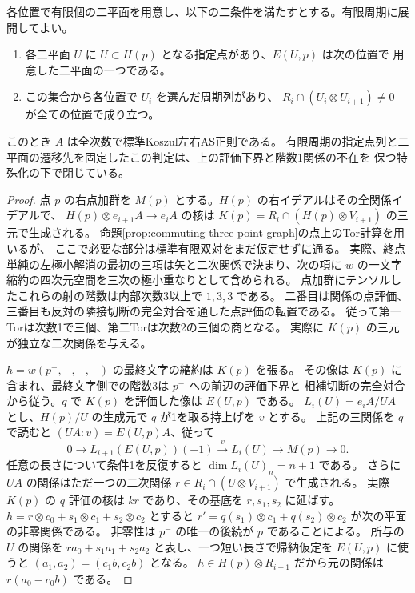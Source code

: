 \begin{theorem}\label{thm:recurrent-point-line-flags}
各位置で有限個の二平面を用意し、以下の二条件を満たすとする。有限周期に展開してよい。
\begin{enumerate}
\item 各二平面 $U$ に $U\subset H(p)$ となる指定点があり、$E(U,p)$ は次の位置で
用意した二平面の一つである。
\item この集合から各位置で $U_i$ を選んだ周期列があり、
$R_i\cap(U_i\otimes U_{i+1})\ne0$ が全ての位置で成り立つ。
\end{enumerate}
このとき $A$ は全次数で標準Koszul左右AS正則である。
有限周期の指定点列と二平面の遷移先を固定したこの判定は、上の評価下界と階数1関係の不在を
保つ特殊化の下で閉じている。
\end{theorem}
\begin{proof}
点 $p$ の右点加群を $M(p)$ とする。$H(p)$ の右イデアルはその全関係イデアルで、
$H(p)\otimes e_{i+1}A\to e_i A$ の核は
$K(p)=R_i\cap(H(p)\otimes V_{i+1})$ の三元で生成される。
命題\ref{prop:commuting-three-point-graph}の点上のTor計算を用いるが、
ここで必要な部分は標準有限双対をまだ仮定せずに通る。
実際、終点単純の左極小解消の最初の三項は矢と二次関係で決まり、次の項に
$w$ の一文字縮約の四次元空間を三次の極小重なりとして含められる。
点加群にテンソルしたこれらの射の階数は内部次数3以上で $1,3,3$ である。
二番目は関係の点評価、三番目も反対の隣接切断の完全対合を通した点評価の転置である。
従って第一Torは次数1で三個、第二Torは次数2の三個の商となる。
実際に $K(p)$ の三元が独立な二次関係を与える。

$h=w(p^-,-,-,-)$ の最終文字の縮約は $K(p)$ を張る。
その像は $K(p)$ に含まれ、最終文字側での階数3は $p^-$ への前辺の評価下界と
相補切断の完全対合から従う。$q$ で $K(p)$ を評価した像は $E(U,p)$ である。
$L_i(U)=e_i A/UA$ とし、$H(p)/U$ の生成元で $q$ が1を取る持上げを $v$ とする。
上記の三関係を $q$ で読むと $(UA:v)=E(U,p) A$、従って
\[
 0\longrightarrow L_{i+1}(E(U,p))(-1)\xrightarrow{\ v\ }L_i(U)
 \longrightarrow M(p)\longrightarrow0 .
\]
任意の長さについて条件1を反復すると $\dim L_i(U)_n=n+1$ である。
さらに $UA$ の関係はただ一つの二次関係 $r\in R_i\cap(U\otimes V_{i+1})$ で生成される。
実際 $K(p)$ の $q$ 評価の核は $kr$ であり、その基底を $r,s_1,s_2$ に延ばす。
$h=r\otimes c_0+s_1\otimes c_1+s_2\otimes c_2$ とすると
$r'=q(s_1)\otimes c_1+q(s_2)\otimes c_2$ が次の平面の非零関係である。
非零性は $p^-$ の唯一の後続が $p$ であることによる。
所与の $U$ の関係を $ra_0+s_1a_1+s_2a_2$ と表し、一つ短い長さで帰納仮定を
$E(U,p)$ に使うと $(a_1,a_2)=(c_1b,c_2b)$ となる。
$h\in H(p)\otimes R_{i+1}$ だから元の関係は $r(a_0-c_0b)$ である。


\end{proof}
